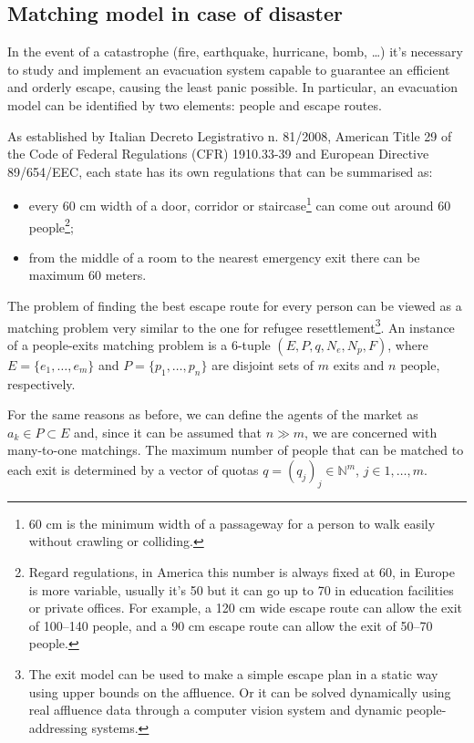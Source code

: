 \subsection{Matching model in case of disaster}\label{matching-model-in-case-of-disaster}%


In the event of a catastrophe (fire, earthquake, hurricane, bomb, \ldots) it's necessary to study and implement an evacuation system capable to guarantee an efficient and orderly escape, causing the least panic possible. In particular, an evacuation model can be identified by two elements: people and escape routes.

\nocite{it-81-2008,usa-1910-1974,cee-654-1989}%
As established by Italian Decreto Legistrativo n. 81/2008, American Title 29 of the Code of Federal Regulations (CFR)
1910.33-39 and European Directive 89/654/EEC, each state has its own regulations that can be summarised as:
\begin{itemize}
    \item every 60 cm width of a door, corridor or staircase\footnote{60 cm is the minimum width of a passageway for a person to walk easily without crawling or colliding.} can come out around 60 people\footnote{Regard regulations, in America this number is always fixed at 60, in Europe is more variable, usually it's 50 but it can go up to 70 in education facilities or private offices. For example, a 120 cm wide escape route can allow the exit of 100--140 people, and a 90 cm escape route can allow the exit of 50--70 people.};
    \item from the middle of a room to the nearest emergency exit there can be maximum 60 meters.
\end{itemize}

The problem of finding the best escape route for every person can be viewed as a matching problem very similar to the one for refugee resettlement\footnote{The exit model can be used to make a simple escape plan in a static way using upper bounds on the affluence.
Or it can be solved dynamically using real affluence data through a computer vision system and dynamic people-addressing systems.}. An instance of a people-exits matching problem is a 6-tuple \((E, P, q, N_e, N_p, F)\), where \(E = \{e_1, \dots, e_m\}\) and \(P = \{p_1, \dots, p_n\}\) are disjoint sets of \(m\) exits and \(n\) people, respectively.

For the same reasons as before, we can define the agents of the market as \(a_k \in P \subset E\) and, since it can be assumed that \(n \gg m\), we are concerned with many-to-one matchings. The maximum number of people that can be matched to each exit is determined by a vector of quotas \(q = (q_j)_j \in \mathbb{N}^m\), \(j\in {1,\ldots,m}\).


